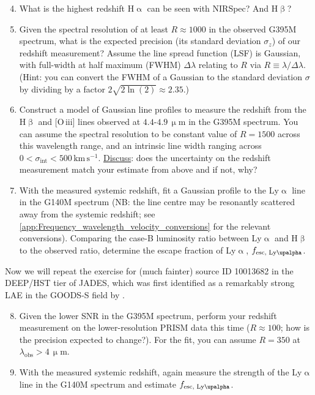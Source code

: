 \documentclass{article}
\newcommand{\Lya}{{Ly\ensuremath{\upalpha}}\xspace}
\newcommand{\OIII}{\hbox{[O\,{\sc iii}]}\xspace}
\newcommand{\Halpha}{\ensuremath{\mathrm{H}\upalpha}\xspace}
\newcommand{\Hbeta}{\ensuremath{\mathrm{H}\upbeta}\xspace}
\theoremstyle{definition}
\begin{document}
\begin{enumerate}[label=(\alph*)]
    \setcounter{enumi}{3}
    \item What is the highest redshift \Halpha can be seen with NIRSpec? And \Hbeta?
    \item Given the spectral resolution of at least $R \approx 1000$ in the observed G395M spectrum, what is the expected precision (its standard deviation $\sigma_z$) of our redshift measurement? Assume the line spread function (LSF) is Gaussian, with full-width at half maximum (FWHM) $\Delta \lambda$ relating to $R$ via $R \equiv \lambda/\Delta\lambda$. (Hint: you can convert the FWHM of a Gaussian to the standard deviation $\sigma$ by dividing by a factor $2 \sqrt{2 \ln(2)} \approx 2.35$.)
    \item Construct a model of Gaussian line profiles to measure the redshift from the \Hbeta and \OIII lines observed at $4.4$-$4.9 \, \mathrm{\upmu m}$ in the G395M spectrum. You can assume the spectral resolution to be constant value of $R = 1500$ across this wavelength range, and an intrinsic line width ranging across $0 < \sigma_\text{int} < 500 \, \mathrm{km \, s^{-1}}$. \underline{Discuss}: does the uncertainty on the redshift measurement match your estimate from above and if not, why?
    \item With the measured systemic redshift, fit a Gaussian profile to the \Lya line in the G140M spectrum (NB: the line centre may be resonantly scattered away from the systemic redshift; see \cref{app:Frequency_wavelength_velocity_conversions} for the relevant conversions). Comparing the case-B luminosity ratio between \Lya and \Hbeta \citep[$L_\text{\Lya}/L_\text{\Hbeta} \approx 23.3$;][]{2023A&A...678A..68S} to the observed ratio, determine the escape fraction of \Lya, $f_\text{esc, \Lya}$.
\end{enumerate}

\noindent Now we will repeat the exercise for (much fainter) source ID 10013682 in the DEEP/HST tier of JADES, which was first identified as a remarkably strong LAE in the GOODS-S field by \citet{2023A&A...678A..68S}.

\begin{enumerate}[label=(\alph*)]
    \setcounter{enumi}{7}
    \item Given the lower SNR in the G395M spectrum, perform your redshift measurement on the lower-resolution PRISM data this time ($R \approx 100$; how is the precision expected to change?). For the fit, you can assume $R = 350$ at $\lambda_\mathrm{obs} > 4 \, \mathrm{\upmu m}$.
    \item With the measured systemic redshift, again measure the strength of the \Lya line in the G140M spectrum and estimate $f_\text{esc, \Lya}$.
\end{enumerate}
\end{document}
